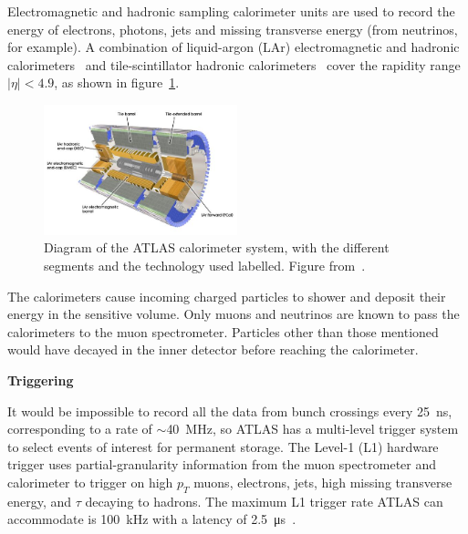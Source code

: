 Electromagnetic and hadronic sampling calorimeter units are used to record the energy of electrons, photons, jets and missing transverse energy (from neutrinos, for example). A combination of liquid-argon (LAr) electromagnetic and hadronic calorimeters~\cite{atlas_lar_cal_tdr} and tile-scintillator hadronic calorimeters~\cite{atlas_tile_cal_tdr} cover the rapidity range $|\eta| < 4.9$, as shown in figure~\ref{fig:atlas_calorimeter}.

\begin{figure}
    \centering
    \includegraphics[width = 0.5\textwidth]{figures/atlas_calorimeter.png}
    \caption{Diagram of the ATLAS calorimeter system, with the different segments and the technology used labelled. Figure from~\cite{collaboration_atlas_2008}.}
    \label{fig:atlas_calorimeter}
\end{figure}

The calorimeters cause incoming charged particles to shower and deposit their energy in the sensitive volume. Only muons and neutrinos are known to pass the calorimeters to the muon spectrometer.  Particles other than those mentioned would have decayed in the inner detector before reaching the calorimeter. 

\textbf{Triggering}

It would be impossible to record all the data from bunch crossings every \SI{25}{\nano\second}, corresponding to a rate of $\sim$\SI{40}{MHz}, so ATLAS has a multi-level trigger system to select events of interest for permanent storage. The Level-1 (L1) hardware trigger uses partial-granularity information from the muon spectrometer and calorimeter to trigger on high $p_T$ muons, electrons, jets, high missing transverse energy, and $\tau$ decaying to hadrons. The maximum L1 trigger rate ATLAS can accommodate is \SI{100}{kHz} with a latency of \SI{2.5}{\micro\second}~\cite{atlas_l1_trigger_tdr}. 


